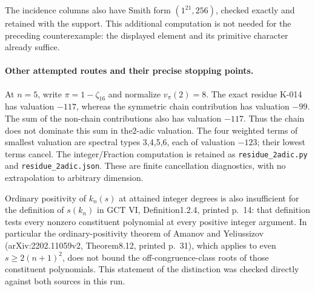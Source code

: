 The incidence columns also have Smith form $(1^{21},256)$, checked
exactly and retained with the support.  This additional computation
is not needed for the preceding counterexample: the displayed
element and its primitive character already suffice.

\paragraph{Other attempted routes and their precise stopping points.}
At $n=5$, write $\pi=1-\zeta_{16}$ and normalize
$v_\pi(2)=8$.  The exact residue K-014 has valuation $-117$,
whereas the symmetric chain contribution has valuation $-99$.
The sum of the non-chain contributions also has valuation $-117$.
Thus the chain does not dominate this sum in the2-adic valuation.
The four weighted terms of smallest valuation are spectral types
3,4,5,6, each of valuation $-123$; their lowest terms cancel.
The integer/Fraction computation is retained as
\texttt{residue\_2adic.py} and \texttt{residue\_2adic.json}.
These are finite cancellation diagnostics, with no extrapolation
to arbitrary dimension.

Ordinary positivity of $k_n(s)$ at attained integer degrees is
also insufficient for the definition of $s(k_n)$ in GCT VI,
Definition1.2.4, printed p.~14: that definition tests every
nonzero constituent polynomial at every positive integer argument.
In particular the ordinary-positivity theorem of Amanov and
Yeliussizov (arXiv:2202.11059v2, Theorem8.12, printed p.~31),
which applies to even $s\ge2(n+1)^2$, does not bound the
off-congruence-class roots of those constituent polynomials.
This statement of the distinction was checked directly against
both sources in this run.
